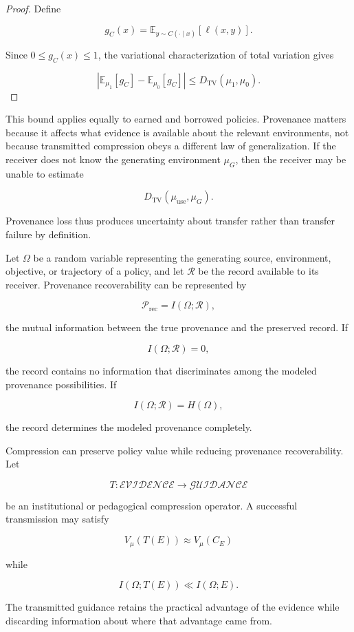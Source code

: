 \documentclass[11pt]{article}
\begin{document}
\begin{proof}
Define

\[
g_C(x)
=
\mathbb{E}_{y\sim C(\cdot\mid x)}
[\ell(x,y)].
\]

Since $0\leq g_C(x)\leq 1$, the variational characterization of total variation gives

\[
\left|
\mathbb{E}_{\mu_1}[g_C]
-
\mathbb{E}_{\mu_0}[g_C]
\right|
\leq
D_{\mathrm{TV}}(\mu_1,\mu_0).
\]
\end{proof}

This bound applies equally to earned and borrowed policies. Provenance matters because it affects what evidence is available about the relevant environments, not because transmitted compression obeys a different law of generalization. If the receiver does not know the generating environment $\mu_G$, then the receiver may be unable to estimate

\[
D_{\mathrm{TV}}(\mu_{\mathrm{use}},\mu_G).
\]

Provenance loss thus produces uncertainty about transfer rather than transfer failure by definition.

Let $\Omega$ be a random variable representing the generating source, environment, objective, or trajectory of a policy, and let $\mathcal{R}$ be the record available to its receiver. Provenance recoverability can be represented by

\[
\mathcal{P}_{\mathrm{rec}}
=
I(\Omega;\mathcal{R}),
\]

the mutual information between the true provenance and the preserved record. If

\[
I(\Omega;\mathcal{R})=0,
\]

the record contains no information that discriminates among the modeled provenance possibilities. If

\[
I(\Omega;\mathcal{R})=H(\Omega),
\]

the record determines the modeled provenance completely.

Compression can preserve policy value while reducing provenance recoverability. Let

\[
T : \mathcal{EVIDENCE}\to\mathcal{GUIDANCE}
\]

be an institutional or pedagogical compression operator. A successful transmission may satisfy

\[
V_{\mu}(T(E))
\approx
V_{\mu}(C_E)
\]

while

\[
I(\Omega;T(E))
\ll
I(\Omega;E).
\]

The transmitted guidance retains the practical advantage of the evidence while discarding information about where that advantage came from.
\end{document}
